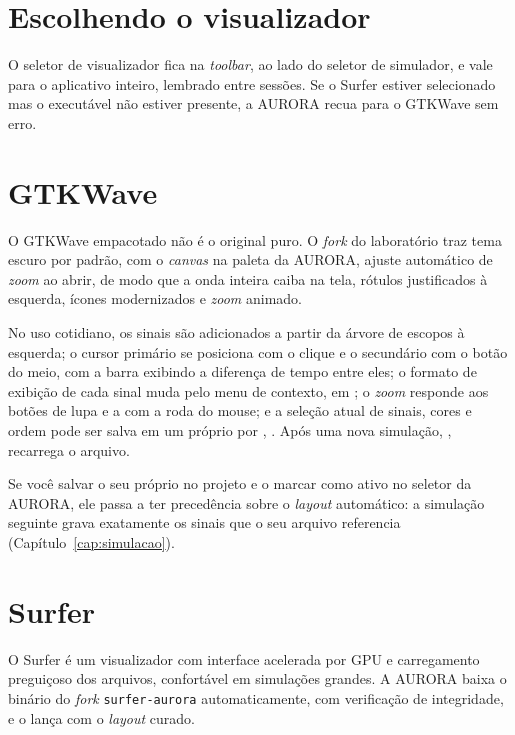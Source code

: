 \section{Escolhendo o visualizador}

O seletor de visualizador fica na \textit{toolbar}, ao lado do seletor de simulador, e vale para o aplicativo inteiro, lembrado entre sessões. Se o Surfer estiver selecionado mas o executável não estiver presente, a AURORA recua para o GTKWave sem erro.

\section{GTKWave}
\label{sec:gtkwave}

O GTKWave empacotado não é o original puro. O \textit{fork} do laboratório traz tema escuro por padrão, com o \textit{canvas} na paleta da AURORA, ajuste automático de \textit{zoom} ao abrir, de modo que a onda inteira caiba na tela, rótulos justificados à esquerda, ícones modernizados e \textit{zoom} animado.

No uso cotidiano, os sinais são adicionados a partir da árvore de escopos à esquerda; o cursor primário se posiciona com o clique e o secundário com o botão do meio, com a barra exibindo a diferença de tempo entre eles; o formato de exibição de cada sinal muda pelo menu de contexto, em ; o \textit{zoom} responde aos botões de lupa e a  com a roda do mouse; e a seleção atual de sinais, cores e ordem pode ser salva em um  próprio por , . Após uma nova simulação, ,  recarrega o arquivo.

\begin{nota}
Se você salvar o seu próprio  no projeto e o marcar como ativo no seletor da AURORA, ele passa a ter precedência sobre o \textit{layout} automático: a simulação seguinte grava exatamente os sinais que o seu arquivo referencia (Capítulo~\ref{cap:simulacao}).
\end{nota}

\section{Surfer}
\label{sec:surfer}

O Surfer é um visualizador com interface acelerada por GPU e carregamento preguiçoso dos arquivos, confortável em simulações grandes. A AURORA baixa o binário do \textit{fork} \texttt{surfer-aurora} automaticamente, com verificação de integridade, e o lança com o \textit{layout} curado.

